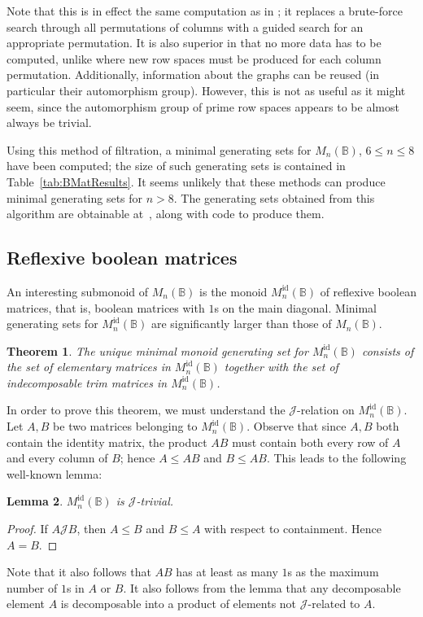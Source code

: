 \documentclass[11pt]{article}
\newtheorem{thm}{Theorem}[subsection]
\newtheorem{lemma}[thm]{Lemma}
\numberwithin{equation}{section}
\newcommand{\B}{\mathbb{B}}
\newcommand{\Bn}{M_n(\B)}
\newcommand{\Refln}{M_n^{\text{id}}(\B)}
\newcommand{\J}{\mathscr{J}}
\begin{document}
Note that this is in effect the same computation as in ; it
replaces a brute-force search through all permutations of columns with a guided
search for an appropriate permutation. It is also superior in that no more data
has to be computed, unlike  where new row spaces must be
produced for each column permutation. Additionally, information about the graphs
can be reused (in particular their automorphism group). However, this is not as
useful as it might seem, since the automorphism group of prime row spaces
appears to be almost always be trivial.

Using this method of filtration, a minimal generating sets for $\Bn$, $6 \leq n
\leq 8$ have been computed; the size of such generating sets is contained in
Table~\ref{tab:BMatResults}. It seems unlikely that these methods can produce
minimal generating sets for $n > 8$. The generating sets obtained from this
algorithm are obtainable at~\cite{Results2020aa}, along with code to produce
them.

\subsection{Reflexive boolean matrices}
\label{sec:RefBoolMat}
An interesting submonoid of $\Bn$ is the monoid $\Refln$ of reflexive boolean
matrices, that is, boolean matrices with $1$s on the main diagonal. Minimal
generating sets for $\Refln$ are significantly larger than those of $\Bn$.
\begin{thm}
  The unique minimal monoid generating set for $\Refln$ consists of the set of
  elementary matrices in $\Refln$ together with the set of indecomposable trim
  matrices in $\Refln$.
\end{thm}

In order to prove this theorem, we must understand the  $\J$-relation on
$\Refln$. Let $A, B$ be two matrices belonging to $\Refln$. Observe that since $A,
B$ both contain the identity matrix, the product $AB$ must contain both every
row of $A$ and every column of $B$; hence $A \leq AB$ and $B \leq AB$. This
leads to the following well-known lemma:

\begin{lemma}
  $\Refln$ is $\J$-trivial. 
\end{lemma}
\begin{proof}
  If $A \J B$, then $A \leq B$ and $B \leq A$ with respect to containment. Hence
  $A = B$.    
\end{proof}
Note that it also follows that $AB$ has at least as many $1$s as the maximum
number of $1$s in $A$ or $B$. It also follows from the lemma that any
decomposable element $A$ is decomposable into a product of elements not
$\J$-related to $A$.
\end{document}
